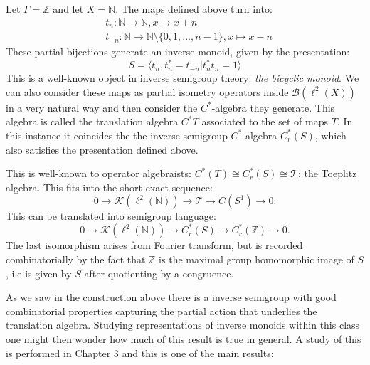\begin{example}\label{Ex:Int2}
Let $\Gamma=\mathbb{Z}$ and let $X=\mathbb{N}$. The maps defined above turn into:
\begin{eqnarray*}
& t_{n}: \mathbb{N} \rightarrow \mathbb{N}, x \mapsto x+n \\
&t_{-n}: \mathbb{N} \rightarrow \mathbb{N}\setminus \lbrace 0,1,...,n-1 \rbrace , x \mapsto x-n
\end{eqnarray*} 
These partial bijections generate an inverse monoid, given by the presentation:
\begin{equation*}
S=\langle t_{n},t_{n}^{*}=t_{-n} | t_{n}^{*}t_{n}=1 \rangle
\end{equation*}
This is a well-known object in inverse semigroup theory: \textit{the bicyclic monoid}. We can also consider these maps as partial isometry operators inside $\mathcal{B}(\ell^{2}(X))$ in a very natural way and then consider the $C^{*}$-algebra they generate. This algebra is called the translation algebra $C^{*}T$ associated to the set of maps $T$. In this instance it coincides the the inverse semigroup $C^{*}$-algebra $C^{*}_{r}(S)$, which also satisfies the presentation defined above.

This is well-known to operator algebraists: $C^{*}(T)\cong C^{*}_{r}(S) \cong \mathcal{T}$: the Toeplitz algebra. This fits into the short exact sequence:
\begin{equation*}
0 \rightarrow \mathcal{K}(\ell^{2}(\mathbb{N})) \rightarrow \mathcal{T} \rightarrow C(S^{1}) \rightarrow 0.
\end{equation*}
This can be translated into semigroup language:
\begin{equation*}
0 \rightarrow \mathcal{K}(\ell^{2}(\mathbb{N})) \rightarrow C^{*}_{r}(S) \rightarrow C^{*}_{r}(\mathbb{Z}) \rightarrow 0.
\end{equation*}
The last isomorphism arises from Fourier transform, but is recorded combinatorially by the fact that $\mathbb{Z}$ is the maximal group homomorphic image of $S$, i.e is given by $S$ after quotienting by a congruence. 
\end{example}

As we saw in the construction above there is a inverse semigroup with good combinatorial properties capturing the partial action that underlies the translation algebra. Studying representations of inverse monoids within this class one might then wonder how much of this result is true in general. A study of this is performed in Chapter 3 and this is one of the main results:

